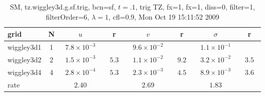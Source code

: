 \begin{table}[hbt]\tableFont %
\begin{center}
\begin{tabular}{|l|c|c|c|c|c|c|c|} \hline 
grid  & N &  $u$  & r &  $v$  & r &  $\sigma$   & r \\ \hline 
          wiggley3d1 &     1 & ~$7.8\times10^{ -3}$~ &           & ~$9.6\times10^{ -2}$~ &           & ~$1.1\times10^{ -1}$~ &            \\ \hline
          wiggley3d2 &     2 & ~$1.5\times10^{ -3}$~ & ~$  5.3$~ & ~$1.1\times10^{ -2}$~ & ~$  9.2$~ & ~$3.2\times10^{ -2}$~ & ~$  3.5$~  \\ \hline
          wiggley3d4 &     4 & ~$2.8\times10^{ -4}$~ & ~$  5.3$~ & ~$2.3\times10^{ -3}$~ & ~$  4.5$~ & ~$8.9\times10^{ -3}$~ & ~$  3.6$~  \\ \hline
    rate             &       &       $2.40$         &       &       $2.69$         &       &       $1.83$         &        \\ \hline
\end{tabular}
\caption{SM, tz.wiggley3d.g.sf.trig, bcn=sf, $t=.1$, trig TZ, fx=1, fx=1, diss=0, filter=1, filterOrder=6, $\lambda=1$, cfl=0.9,  Mon Oct 19 15:11:52 2009}\label{table:tz.wiggley3d.g.sf.trig}
\end{center}
\end{table}
